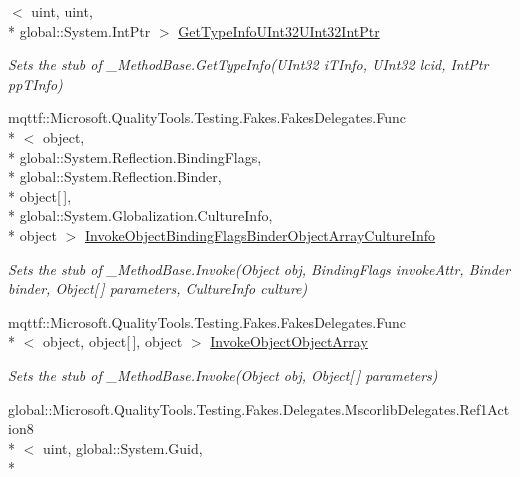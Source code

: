 \begin{DoxyCompactItemize}
$<$ uint, uint, \\*
global\-::\-System.\-Int\-Ptr $>$ \hyperlink{class_system_1_1_runtime_1_1_interop_services_1_1_fakes_1_1_stub___method_base_a123d07fc900061a6eacd7ac0edeac04c}{Get\-Type\-Info\-U\-Int32\-U\-Int32\-Int\-Ptr}
\begin{DoxyCompactList}\small\item\em Sets the stub of \-\_\-\-Method\-Base.\-Get\-Type\-Info(\-U\-Int32 i\-T\-Info, U\-Int32 lcid, Int\-Ptr pp\-T\-Info)\end{DoxyCompactList}\item 
mqttf\-::\-Microsoft.\-Quality\-Tools.\-Testing.\-Fakes.\-Fakes\-Delegates.\-Func\\*
$<$ object, \\*
global\-::\-System.\-Reflection.\-Binding\-Flags, \\*
global\-::\-System.\-Reflection.\-Binder, \\*
object\mbox{[}$\,$\mbox{]}, \\*
global\-::\-System.\-Globalization.\-Culture\-Info, \\*
object $>$ \hyperlink{class_system_1_1_runtime_1_1_interop_services_1_1_fakes_1_1_stub___method_base_af1b7c9e72834513a57bb310961629fd4}{Invoke\-Object\-Binding\-Flags\-Binder\-Object\-Array\-Culture\-Info}
\begin{DoxyCompactList}\small\item\em Sets the stub of \-\_\-\-Method\-Base.\-Invoke(\-Object obj, Binding\-Flags invoke\-Attr, Binder binder, Object\mbox{[}$\,$\mbox{]} parameters, Culture\-Info culture)\end{DoxyCompactList}\item 
mqttf\-::\-Microsoft.\-Quality\-Tools.\-Testing.\-Fakes.\-Fakes\-Delegates.\-Func\\*
$<$ object, object\mbox{[}$\,$\mbox{]}, object $>$ \hyperlink{class_system_1_1_runtime_1_1_interop_services_1_1_fakes_1_1_stub___method_base_a7f0bb2ebcbdd3005f493e1aa5c5802ec}{Invoke\-Object\-Object\-Array}
\begin{DoxyCompactList}\small\item\em Sets the stub of \-\_\-\-Method\-Base.\-Invoke(\-Object obj, Object\mbox{[}$\,$\mbox{]} parameters)\end{DoxyCompactList}\item 
global\-::\-Microsoft.\-Quality\-Tools.\-Testing.\-Fakes.\-Delegates.\-Mscorlib\-Delegates.\-Ref1\-Action8\\*
$<$ uint, global\-::\-System.\-Guid, \\*

\end{DoxyCompactItemize}
